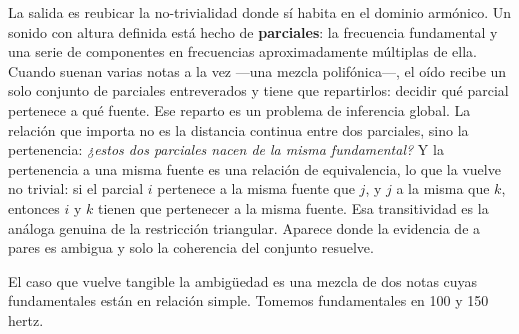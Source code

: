 \documentclass[11pt]{article}
\begin{document}
La salida es reubicar la no-trivialidad donde sí habita en el dominio armónico. Un sonido con altura definida está hecho de \textbf{parciales}: la frecuencia fundamental y una serie de componentes en frecuencias aproximadamente múltiplas de ella. Cuando suenan varias notas a la vez —una mezcla polifónica—, el oído recibe un solo conjunto de parciales entreverados y tiene que repartirlos: decidir qué parcial pertenece a qué fuente. Ese reparto es un problema de inferencia global. La relación que importa no es la distancia continua entre dos parciales, sino la pertenencia: \emph{¿estos dos parciales nacen de la misma fundamental?} Y la pertenencia a una misma fuente es una relación de equivalencia, lo que la vuelve no trivial: si el parcial $i$ pertenece a la misma fuente que $j$, y $j$ a la misma que $k$, entonces $i$ y $k$ tienen que pertenecer a la misma fuente. Esa transitividad es la análoga genuina de la restricción triangular. Aparece donde la evidencia de a pares es ambigua y solo la coherencia del conjunto resuelve.

El caso que vuelve tangible la ambigüedad es una mezcla de dos notas cuyas fundamentales están en relación simple. Tomemos fundamentales en 100 y 150 hertz.
\end{document}
